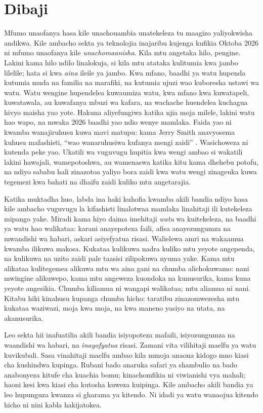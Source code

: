 \chapter*{Dibaji}
Mfumo unaofanya hasa kile unachouambia unatekeleza tu maagizo yaliyokwisha andikwa. Kile ambacho sekta ya teknolojia inajaribu kujenga kufikia Oktoba 2026 ni mfumo unaofanya kile \emph{unachomaanisha}. Kila mtu angetaka hilo, pengine. Lakini kama hilo ndilo linalokuja, si kila mtu atataka kulitumia kwa jambo lilelile; hata si kwa \emph{aina} ileile ya jambo. Kwa mfano, baadhi ya watu hupenda kutumia muda na familia na marafiki, na kutumia ujuzi wao kuboresha ustawi wa watu. Watu wengine hupendelea kuwaumiza watu, kwa mfano kwa kuwatapeli, kuwatawala, au kuwafanya mbuzi wa kafara, na wachache huendelea kuchagua hivyo maisha yao yote. Hakuna aliyefungiwa katika njia moja milele, lakini watu hao wapo, na mwaka 2026 baadhi yao ndio wenye mamlaka. Faida yao ni kwamba wanajiruhusu kuwa mavi matupu: kama Jerry Smith anavyosema kuhusu mafashisti, “wao wanaruhusiwa kufanya mengi zaidi” \autocite{rickandmorty2023}. Wasichoweza ni kutenda peke yao. Ukatili wa vuguvugu hupitia kwa wengi ambao si wakatili lakini hawajali, wamepotoshwa, au wamenaswa katika kitu kama dhehebu potofu, na ndiyo sababu hali zinazotoa yaliyo bora zaidi kwa watu wengi zinageuka kuwa tegemezi kwa bahati na dhaifu zaidi kuliko mtu angetarajia.

Katika muktadha huo, labda ina haki kuhofia kwamba akili bandia ndiyo hasa kile ambacho vuguvugu la kifashisti linalotwaa mamlaka linahitaji ili kutekeleza mipango yake. Miradi kama hiyo daima imehitaji \emph{watu} wa kuitekeleza, na baadhi ya watu hao walikataa: karani anayepoteza faili, afisa anayezungumza na mwandishi wa habari, askari asiyefyatua risasi. Walielewa amri na wakaamua kwamba ilikuwa makosa. Kukataa kulikuwa nadra kuliko mtu yeyote angependa, na kulikuwa na uzito zaidi pale taasisi zilipokuwa nyuma yake. Kama mtu alikataa kulitegemea alikuwa mtu wa aina gani na chumba alichokuwamo: nani mwingine alikuwepo, kama mtu angeweza kuondoka na kunusurika, kama kuna yeyote angesikia. Chumba kiliamua ni wangapi walikataa; mtu aliamua ni nani. Kitabu hiki kinahusu kupanga chumba hicho: taratibu zinazomwezesha mtu kukataa waziwazi, moja kwa moja, na kwa maneno yasiyo na utata, na akanusurika.

Leo sekta hii inafuatilia akili bandia isiyopoteza mafaili, isiyozungumza na waandishi wa habari, na \emph{inayofyatua} risasi. Zamani vita vilihitaji maelfu ya watu kuvikubali. Sasa vinahitaji maelfu ambao kila mmoja anaona kidogo mno kiasi cha kushindwa kupinga. Rubani bado anaruka safari ya shambulio na bado anabonyeza kitufe cha kuachia bomu; kinachomfikia ni viwianishi vya mahali; haoni kesi kwa kiasi cha kutosha kuweza kuipinga. Kile ambacho akili bandia ya leo hupunguza kwanza si gharama ya kitendo. Ni idadi ya watu wanaojua kitendo hicho ni nini kabla hakijatokea.

